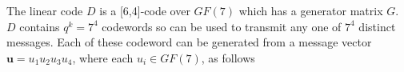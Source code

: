 \begin{comment}
Finally, assume that $u_1=u_2=u_3=u_4=6$ then for this choice of digits we have no further freedom to choice any other digits. Thus, there is only one codeword in $D$, i.e. $7^0$, and that codeword is $6   6   6   6   0   4$.

In what follows there are seven symbols in the alphabet of $D$ and these are chosen to be over $GF\{7\}$ and there are a total of $q^k = 7^4$ distinct codewords in $D$.
\begin{itemize}
\item
The number of codewords of $D$ that have the symbol "6" in any \textit{single} specified coordinate position is as follows:

The probability of a given symbol, say "6", appearing at any specified coordinate position of a codeword of $D$ is $1/7$. Therefore the total number of the symbol "6" appearing at a specified coordinate position is $1/7 \times 7^4 = 7^3$.
\item
The number of codewords of $D$ that have the symbol "6" in any \textit{pair} of specified coordinate position is as follows:

The probability of a pair of sixes appearing at any specified pair of coordinate positions is $1/7\times1/7$. Therefore the total number of the symbol "6" appearing at a specified pair of coordinate position is $1/7^2 \times 7^4 = 7^2$.
\item
The number of codewords of $D$ that have the symbol "6" in any \textit{triple} of specified coordinate positions is as follows:

The probability of a triple of "6" appearing at any specified triple of coordinate positions is $1/7\times1/7\times1/7$. Therefore the total count of the symbol "6" appearing at a specified triple of coordinate position is $1/7^3 \times 7^4 = 7$.
\item
The number of codewords of $D$ that have the symbol "6" in any \textit{quadruple} of specified coordinate positions is as follows:

The probability of a quadruple of "6" appearing at any specified quadruple of coordinate positions is $1/7\times1/7\times1/7\times1/7$. Therefore the the total number of the symbol "6" appearing at a specified quadruple of coordinate position is $1/7^4 \times 7^4 = 7^0$.
\end{itemize}
\end{comment}
The linear code $D$ is a [6,4]-code over $GF(7)$ which has a generator matrix $G$.  $D$ contains $q^k =7^4$ codewords so can be used to transmit any one of $7^4$ distinct messages. Each of these codeword can be generated from a message vector $\bm{u}=u_1u_2u_3u_4$, where each $u_i \in GF(7)$, as follows
